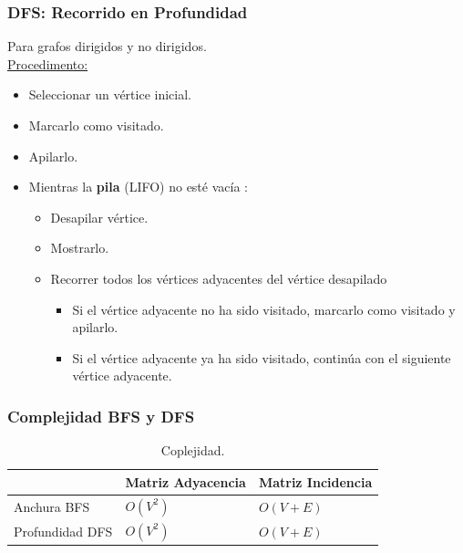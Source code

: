 \documentclass[../main.tex]{subfiles}
\begin{document}
            \subsubsection{DFS: Recorrido en Profundidad}
                Para grafos dirigidos y no dirigidos.\\
                
                \underline{Procedimento:}
                \begin{itemize}
                    \item Seleccionar un vértice inicial.
                    \item Marcarlo como visitado.
                    \item Apilarlo.
                    \item Mientras la \textbf{pila} (LIFO) no esté vacía :
                        \begin{itemize}
                            \item Desapilar vértice.
                            \item Mostrarlo.
                            \item Recorrer todos los vértices adyacentes del vértice desapilado
                                \begin{itemize}
                                    \item Si el vértice adyacente no ha sido visitado, marcarlo como visitado y apilarlo.
                                    \item Si el vértice adyacente ya ha sido visitado, continúa con el siguiente vértice adyacente.
                                \end{itemize}
                        \end{itemize}
                \end{itemize}

            \subsubsection{Complejidad BFS y DFS}
                
                \begin{table}[ht]
                    \centering
                    \begin{tabular}{|l|l|l|}
                    \hline
                    & Matriz Adyacencia & Matriz Incidencia  \\ \hline
                    Anchura BFS & $O(V^2)$ & $O(V+E)$ \\ \hline
                    Profundidad DFS & $O(V^2)$ & $O(V+E)$  \\ \hline
                    \end{tabular}
                    \caption[short]{Coplejidad.}
                    \label{tab:tabla_complejidad_bfs_dfs}
                \end{table}
\end{document}
